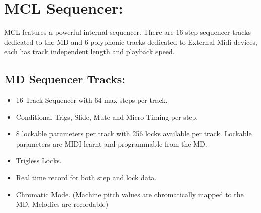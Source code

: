 \chapter{MCL Sequencer:}
MCL features a powerful internal sequencer. There are 16 step sequencer tracks dedicated to the MD and 6 polyphonic tracks dedicated to External Midi devices, each has track independent length and playback speed.
\section{MD Sequencer Tracks:}
\begin{itemize}
\item 16 Track Sequencer with 64 max steps per track.
\item Conditional Trigs, Slide, Mute and Micro Timing per step.
\item 8 lockable parameters per track with 256 locks available per track. Lockable parameters are MIDI learnt and programmable from the MD.
\item Trigless Locks.
\item Real time record for both step and lock data.
\item Chromatic Mode. (Machine pitch values are chromatically mapped to the MD. Melodies are recordable)
\end{itemize}
